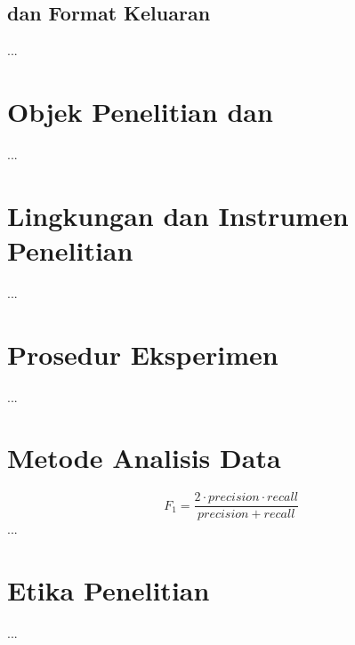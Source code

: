 \subsection{ dan Format Keluaran}
...

\section{Objek Penelitian dan }
\label{sec:dataset}
...

\section{Lingkungan dan Instrumen Penelitian}
\label{sec:lingkungan}
...

\section{Prosedur Eksperimen}
\label{sec:prosedur}
...

\section{Metode Analisis Data}
\label{sec:analisis}
\begin{equation}
  F_1 = \frac{2 \cdot \mathit{precision} \cdot \mathit{recall}}{\mathit{precision} + \mathit{recall}}
  \label{eq:f1}
\end{equation}
...

\section{Etika Penelitian}
\label{sec:etika}
...
